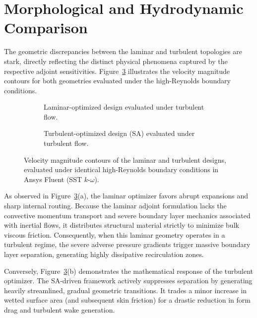 \section{Morphological and Hydrodynamic Comparison}
\label{sec:app_lam_vs_turb_morphology}
The geometric discrepancies between the laminar and turbulent topologies are stark, directly reflecting the distinct physical phenomena captured by the respective adjoint sensitivities. Figure~\ref{fig:app_velocity_comparison} illustrates the velocity magnitude contours for both geometries evaluated under the high-Reynolds boundary conditions.

\begin{figure}[!ht]
	\centering
	\begin{subfigure}[b]{0.47\textwidth}
		\centering
		\caption{Laminar-optimized design evaluated under turbulent flow.}
		\label{fig:app_laminar_vel}
	\end{subfigure}
	\hfill
	\begin{subfigure}[b]{0.47\textwidth}
		\centering
		\caption{Turbulent-optimized design (SA) evaluated under turbulent flow.}
		\label{fig:app_turbulent_vel}
	\end{subfigure}
	\caption{Velocity magnitude contours of the laminar and turbulent designs, evaluated under identical high-Reynolds boundary conditions in Ansys Fluent (SST $k$-$\omega$).}
	\label{fig:app_velocity_comparison}
\end{figure}

As observed in Figure~\ref{fig:app_velocity_comparison}(a), the laminar optimizer favors abrupt expansions and sharp internal routing. Because the laminar adjoint formulation lacks the convective momentum transport and severe boundary layer mechanics associated with inertial flows, it distributes structural material strictly to minimize bulk viscous friction. Consequently, when this laminar geometry operates in a turbulent regime, the severe adverse pressure gradients trigger massive boundary layer separation, generating highly dissipative recirculation zones. 

Conversely, Figure~\ref{fig:app_velocity_comparison}(b) demonstrates the mathematical response of the turbulent optimizer. The SA-driven framework actively suppresses separation by generating heavily streamlined, gradual geometric transitions. It trades a minor increase in wetted surface area (and subsequent skin friction) for a drastic reduction in form drag and turbulent wake generation.

